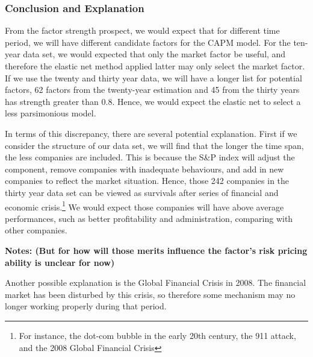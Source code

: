 
\subsubsection{Conclusion and Explanation}
From the factor strength prospect, we would expect that for different time period, we will have different candidate factors for the CAPM model.
For the ten-year data set, we would expected that only the market factor be useful, and therefore the elastic net method applied latter may only select the market factor.
If we use the twenty and thirty year data, we will have a longer list for potential factors, 62 factors from the twenty-year estimation and 45 from the thirty years has strength greater than 0.8.
Hence, we would expect the elastic net to select a less parsimonious model. 

In terms of this discrepancy, there are several potential explanation.
First if we consider the structure of our data set, we will find that the longer the time span, the less companies are included.
This is because the S\&P index will adjust the component, remove companies with inadequate behaviours, and add in new companies to reflect the market situation.
Hence, those 242 companies in the thirty year data set can be viewed as survivals after series of financial and economic crisis.\footnote{For instance, the dot-com bubble in the early 20th century, the 911 attack, and the 2008 Global Financial Crisis}
We would expect those companies will have above average performances, such as better profitability and administration, comparing with other companies. 

{\bf Notes: (But for how will those merits influence the factor's risk pricing ability is unclear for now)}

Another possible explanation is the Global Financial Crisis in 2008.
The financial market has been disturbed by this crisis, so therefore some mechanism may no longer working properly during that period.

